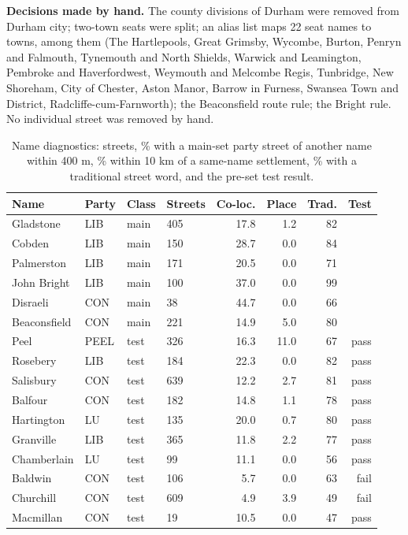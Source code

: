 \documentclass[11pt,a4paper]{article}
\begin{document}
\textbf{Decisions made by hand.} The county divisions of Durham were removed from Durham city; two-town seats were split; an alias list maps 22 seat names to towns, among them (The Hartlepools, Great Grimsby, Wycombe, Burton, Penryn and Falmouth, Tynemouth and North Shields, Warwick and Leamington, Pembroke and Haverfordwest, Weymouth and Melcombe Regis, Tunbridge, New Shoreham, City of Chester, Aston Manor, Barrow in Furness, Swansea Town and District, Radcliffe-cum-Farnworth); the Beaconsfield route rule; the Bright rule. No individual street was removed by hand.

\begin{small}\begin{longtable}{llllrrrr}\caption{Name diagnostics: streets, \% with a main-set party street of another name within 400 m, \% within 10 km of a same-name settlement, \% with a traditional street word, and the pre-set test result.}\label{tab:diag}\\\toprule Name & Party & Class & Streets & Co-loc. & Place & Trad. & Test\\\midrule\endhead
Gladstone & LIB & main & 405 & 17.8 & 1.2 & 82 & \\
Cobden & LIB & main & 150 & 28.7 & 0.0 & 84 & \\
Palmerston & LIB & main & 171 & 20.5 & 0.0 & 71 & \\
John Bright & LIB & main & 100 & 37.0 & 0.0 & 99 & \\
Disraeli & CON & main & 38 & 44.7 & 0.0 & 66 & \\
Beaconsfield & CON & main & 221 & 14.9 & 5.0 & 80 & \\
Peel & PEEL & test & 326 & 16.3 & 11.0 & 67 & pass\\
Rosebery & LIB & test & 184 & 22.3 & 0.0 & 82 & pass\\
Salisbury & CON & test & 639 & 12.2 & 2.7 & 81 & pass\\
Balfour & CON & test & 182 & 14.8 & 1.1 & 78 & pass\\
Hartington & LU & test & 135 & 20.0 & 0.7 & 80 & pass\\
Granville & LIB & test & 365 & 11.8 & 2.2 & 77 & pass\\
Chamberlain & LU & test & 99 & 11.1 & 0.0 & 56 & pass\\
Baldwin & CON & test & 106 & 5.7 & 0.0 & 63 & fail\\
Churchill & CON & test & 609 & 4.9 & 3.9 & 49 & fail\\
Macmillan & CON & test & 19 & 10.5 & 0.0 & 47 & pass\\

\end{longtable}
\end{small}
\end{document}
